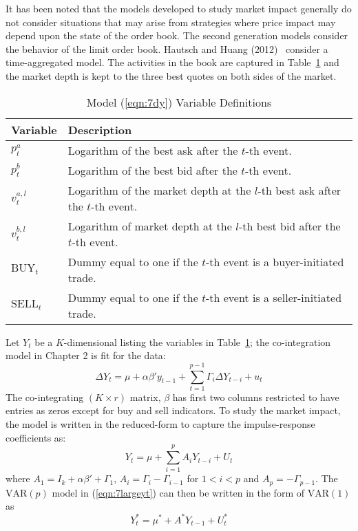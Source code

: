 It has been noted that the models developed to study market impact generally do not consider situations that may arise from strategies where price impact may depend upon the state of the order book. The second generation models consider the behavior of the limit order book. Hautsch and Huang (2012)~\cite{hauthuang} consider a time-aggregated model. The activities in the book are captured in Table~\ref{tab:vardef} and the market depth is kept to the three best quotes on both sides of the market.
	\begin{table}[!ht]
	\centering
	\caption{Model (\ref{eqn:7dy}) Variable Definitions \label{tab:vardef}}
	\begin{tabular}{ll}
	Variable & Description \\ \hline
	$p_t^a$ & Logarithm of the best ask after the $t$-th event. \\
	$p_t^b$ & Logarithm of the best bid after the $t$-th event. \\
	$v_t^{a,l}$ & Logarithm of the market depth at the $l$-th best ask after the $t$-th event. \\
	$v_t^{b,l}$ & Logarithm of market depth at the $l$-th best bid after the $t$-th event. \\
	$\text{BUY}_t$ & Dummy equal to one if the $t$-th event is a buyer-initiated trade. \\
	$\text{SELL}_t$ & Dummy equal to one if the $t$-th event is a seller-initiated trade. 
	\end{tabular} 
	\end{table}
Let $Y_t$ be a $K$-dimensional listing the variables in Table~\ref{tab:vardef}; the co-integration model in Chapter 2 is fit for the data:
	\begin{equation} \label{eqn:7dy}
	\Delta Y_t = \mu + \alpha \beta' y_{t-1} + \sum_{t=1}^{p-1} \Gamma_i \Delta Y_{t-i} + u_t
	\end{equation}
The co-integrating $(K \times r)$ matrix, $\beta$ has first two columns restricted to have entries as zeros except for buy and sell indicators. To study the market impact, the model is written in the reduced-form to capture the impulse-response coefficients as:
	\begin{equation}\label{eqn:7largeyt}
	Y_t = \mu + \sum_{i=1}^p A_i Y_{t-i} + U_t
	\end{equation}
where $A_1=I_k+\alpha\beta' + \Gamma_1$, $A_i=\Gamma_i - \Gamma_{i-1}$ for $1<i<p$ and $A_p= -\Gamma_{p-1}$. The $\text{VAR}(p)$ model in (\ref{eqn:7largeyt}) can then be written in the form of $\text{VAR}(1)$ as 
	\begin{equation}\label{eqn:starlargeyt}
	Y_t^*= \mu^* + A^* Y_{t-1} + U_t^*
	\end{equation}
